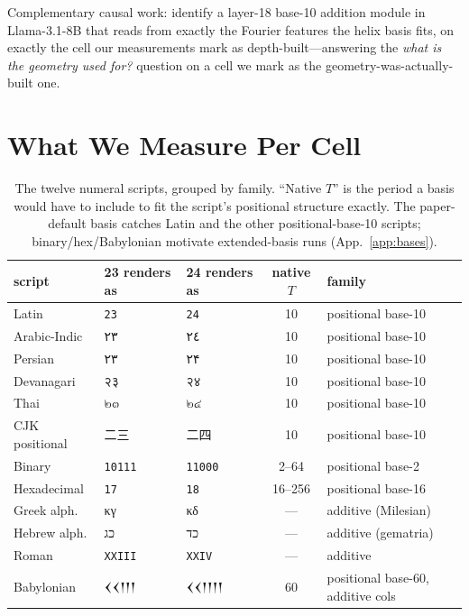 \documentclass[10pt,letterpaper]{article}
\newcommand{\arabicnum}[1]{{\arabicscriptfont #1}}
\newcommand{\devnum}[1]{{\devanagariscriptfont #1}}
\newcommand{\thainum}[1]{{\thaiscriptfont #1}}
\newcommand{\hebnum}[1]{{\hebrewscriptfont #1}}
\newcommand{\greeknum}[1]{{\greekscriptfont #1}}
\newcommand{\cuneinum}[1]{{\cuneiformscriptfont #1}}
\begin{document}
Complementary causal work: \citet{feucht2026wild} identify a layer-18
base-10 addition module in Llama-3.1-8B that reads from exactly the
Fourier features the helix basis fits, on exactly the cell our
measurements mark as depth-built---answering the
\emph{what is the geometry used for?} question on a cell we mark as
the geometry-was-actually-built one.

\section{What We Measure Per Cell}
\label{sec:diagnostic}

\begin{table}[t]
\caption{The twelve numeral scripts, grouped by family. ``Native $T$''
  is the period a basis would have to include to fit the script's
  positional structure exactly. The paper-default basis catches Latin
  and the other positional-base-10 scripts; binary/hex/Babylonian
  motivate extended-basis runs (App.~\ref{app:bases}).}
\label{tab:scripts}
\centering
\small
\begin{tabular}{lllcl}
\toprule
script         & 23 renders as           & 24 renders as            & native $T$ & family \\
\midrule
Latin          & \texttt{23}             & \texttt{24}              & 10  & positional base-10 \\
Arabic-Indic   & \arabicnum{٢٣}          & \arabicnum{٢٤}           & 10  & positional base-10 \\
Persian        & \arabicnum{۲۳}          & \arabicnum{۲۴}           & 10  & positional base-10 \\
Devanagari     & \devnum{२३}              & \devnum{२४}              & 10  & positional base-10 \\
Thai           & \thainum{๒๓}            & \thainum{๒๔}             & 10  & positional base-10 \\
CJK positional & 二三                    & 二四                     & 10  & positional base-10 \\
\midrule
Binary         & \texttt{10111}          & \texttt{11000}           & 2--64 & positional base-2 \\
Hexadecimal    & \texttt{17}             & \texttt{18}              & 16--256 & positional base-16 \\
\midrule
Greek alph.    & \greeknum{κγ}           & \greeknum{κδ}            & ---  & additive (Milesian) \\
Hebrew alph.   & \hebnum{כג}             & \hebnum{כד}              & ---  & additive (gematria) \\
Roman          & \texttt{XXIII}          & \texttt{XXIV}            & ---  & additive \\
\midrule
Babylonian     & \cuneinum{𒌋𒌋𒁹𒁹𒁹} & \cuneinum{𒌋𒌋𒁹𒁹𒁹𒁹} & 60 & positional base-60, additive cols \\
\bottomrule
\end{tabular}
\end{table}
\end{document}
